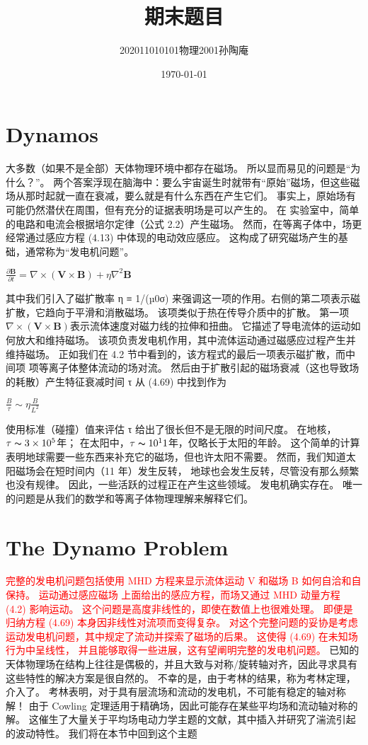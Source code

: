 \documentclass[12pt, a4paper, oneside]{ctexart}
\title{期末题目}
\date{\today}
\author{202011010101物理2001孙陶庵}
\begin{document}
\begin{spacing}{2.0}
\tableofcontents
\maketitle

\section{Dynamos}
大多数（如果不是全部）天体物理环境中都存在磁场。 所以显而易见的问题是“为什么？”。 
两个答案浮现在脑海中：要么宇宙诞生时就带有“原始”磁场，但这些磁场从那时起就一直在衰减，要么就是有什么东西在产生它们。 
事实上，原始场有可能仍然潜伏在周围，但有充分的证据表明场是可以产生的。 在
实验室中，简单的电路和电流会根据培尔定律（公式 2.2）产生磁场。 
然而，在等离子体中，场更经常通过感应方程 (4.13) 中体现的电动效应感应。 这构成了研究磁场产生的基础，通常称为“发电机问题”。
\begin{center}
    $\displaystyle\frac{\partial\mathbf B}{\partial t}=\nabla\times(\mathbf V\times\mathbf B)+\eta\nabla^2\mathbf B$
\end{center}
其中我们引入了磁扩散率 η ≡ 1/(µ0σ) 来强调这一项的作用。右侧的第二项表示磁扩散，它趋向于平滑和消散磁场。 该项类似于热在传导介质中的扩散。
第一项$\nabla\times(\mathbf V\times\mathbf B)$表示流体速度对磁力线的拉伸和扭曲。 它描述了导电流体的运动如何放大和维持磁场。 
该项负责发电机作用，其中流体运动通过磁感应过程产生并维持磁场。 正如我们在 4.2 节中看到的，该方程式的最后一项表示磁扩散，而中间项
项等离子体整体流动的场对流。 然后由于扩散引起的磁场衰减（这也导致场的耗散）产生特征衰减时间 τ 从 (4.69) 中找到作为
\begin{center}
    $\displaystyle\frac{B}{\tau}\sim\eta\frac{B}{L^2}$
\end{center}
使用标准（碰撞）值来评估 τ 给出了很长但不是无限的时间尺度。 在地核，$\tau \thicksim 3\times 10^5$年； 在太阳中，$\tau \thicksim 10^11$年，仅略长于太阳的年龄。 
这个简单的计算表明地球需要一些东西来补充它的磁场，但也许太阳不需要。 然而，我们知道太阳磁场会在短时间内（11 年）发生反转，
地球也会发生反转，尽管没有那么频繁也没有规律。 因此，一些活跃的过程正在产生这些领域。 发电机确实存在。 
唯一的问题是从我们的数学和等离子体物理理解来解释它们。
\section{The Dynamo Problem}
\textcolor{red}{完整的发电机问题包括使用 MHD 方程来显示流体运动 V 和磁场 B 如何自洽和自保持。 运动通过感应磁场
上面给出的感应方程，而场又通过 MHD 动量方程 (4.2) 影响运动。 这个问题是高度非线性的，即使在数值上也很难处理。 即便是
归纳方程 (4.69) 本身因非线性对流项而变得复杂。
对这个完整问题的妥协是考虑运动发电机问题，其中规定了流动并探索了磁场的后果。 这使得 (4.69) 在未知场行为中呈线性，
并且能够取得一些进展，这有望阐明完整的发电机问题。}
已知的天体物理场在结构上往往是偶极的，并且大致与对称/旋转轴对齐，因此寻求具有这些特性的解决方案是很自然的。 
不幸的是，由于考林的结果，称为考林定理，介入了。 考林表明，对于具有层流场和流动的发电机，不可能有稳定的轴对称解！
由于 Cowling 定理适用于精确场，因此可能存在某些平均场和流动轴对称的解。 这催生了大量关于平均场电动力学主题的文献，其中插入并研究了湍流引起的波动特性。 
我们将在本节中回到这个主题



\end{spacing}
\end{document}
